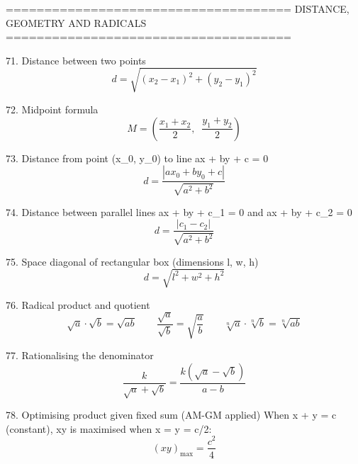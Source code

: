 =====================================
DISTANCE, GEOMETRY AND RADICALS
=====================================
 
71. Distance between two points
$$ d = \sqrt{(x_2 - x_1)^2 + (y_2 - y_1)^2} $$
 
72. Midpoint formula
$$ M = \left( \frac{x_1 + x_2}{2}, \;\; \frac{y_1 + y_2}{2} \right) $$
 
73. Distance from point (x_0, y_0) to line  ax + by + c = 0
$$ d = \frac{\left| ax_0 + by_0 + c \right|}{\sqrt{a^2 + b^2}} $$
 
74. Distance between parallel lines  ax + by + c_1 = 0  and  ax + by + c_2 = 0
$$ d = \frac{\left| c_1 - c_2 \right|}{\sqrt{a^2 + b^2}} $$
 
75. Space diagonal of rectangular box  (dimensions l, w, h)
$$ d = \sqrt{l^2 + w^2 + h^2} $$
 
76. Radical product and quotient
$$ \sqrt{a} \cdot \sqrt{b} = \sqrt{ab} \qquad \frac{\sqrt{a}}{\sqrt{b}} = \sqrt{\frac{a}{b}} \qquad \sqrt[n]{a} \cdot \sqrt[n]{b} = \sqrt[n]{ab} $$
 
77. Rationalising the denominator
$$ \frac{k}{\sqrt{a} + \sqrt{b}} = \frac{k\left(\sqrt{a} - \sqrt{b}\right)}{a - b} $$
 
78. Optimising product given fixed sum  (AM-GM applied)
When x + y = c (constant), xy is maximised when x = y = c/2:
$$ (xy)_{\max} = \frac{c^2}{4} $$
 
